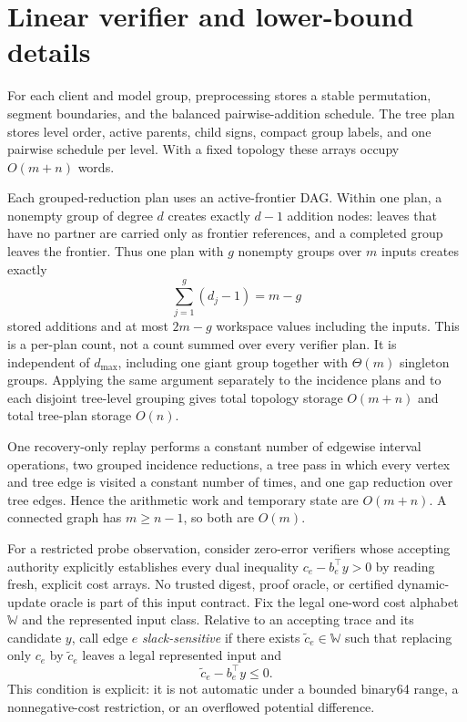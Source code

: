 \section{Linear verifier and lower-bound details}
\label{app:linear}

For each client and model group, preprocessing stores a stable permutation,
segment boundaries, and the balanced pairwise-addition schedule.  The tree plan
stores level order, active parents, child signs, compact group labels, and one
pairwise schedule per level.  With a fixed topology these arrays occupy
$O(m+n)$ words.

Each grouped-reduction plan uses an active-frontier DAG.  Within one plan, a
nonempty group of degree $d$ creates exactly $d-1$ addition nodes: leaves that
have no partner are carried only as frontier references, and a completed group
leaves the frontier.  Thus one plan with $g$ nonempty groups over $m$ inputs
creates exactly
\begin{equation}
 \sum_{j=1}^g(d_j-1)=m-g
 \label{eq:reduction-node-count}
\end{equation}
stored additions and at most $2m-g$ workspace values including the inputs.
This is a per-plan count, not a count summed over every verifier plan.  It is
independent of $d_{\max}$, including one giant group together with
$\Theta(m)$ singleton groups.  Applying the same argument separately to the
incidence plans and to each disjoint tree-level grouping gives total topology
storage $O(m+n)$ and total tree-plan storage $O(n)$.

One recovery-only replay performs a constant number of edgewise interval
operations, two grouped incidence reductions, a tree pass in which every vertex
and tree edge is visited a constant number of times, and one gap reduction over
tree edges.  Hence the arithmetic work and temporary state are $O(m+n)$.  A
connected graph has $m\ge n-1$, so both are $O(m)$.

For a restricted probe observation, consider zero-error verifiers whose accepting
authority explicitly establishes every dual inequality
$c_e-b_e^\top y>0$ by reading fresh, explicit cost arrays.  No trusted digest,
proof oracle, or certified dynamic-update oracle is part of this input contract.
Fix the legal one-word cost alphabet $\mathbb W$ and the represented input
class.  Relative to an accepting trace and its candidate $y$, call edge $e$
\emph{slack-sensitive} if there exists
$\widetilde c_e\in\mathbb W$ such that replacing only $c_e$ by
$\widetilde c_e$ leaves a legal represented input and
\begin{equation}
 \widetilde c_e-b_e^\top y\le0.
 \label{eq:slack-sensitive}
\end{equation}
This condition is explicit: it is not automatic under a bounded binary64 range,
a nonnegative-cost restriction, or an overflowed potential difference.

